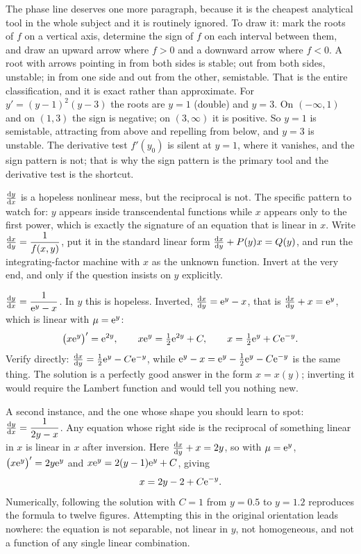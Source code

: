 The phase line deserves one more paragraph, because it is the cheapest analytical tool in the whole subject and it is routinely ignored. To draw it: mark the roots of $f$ on a vertical axis, determine the sign of $f$ on each interval between them, and draw an upward arrow where $f>0$ and a downward arrow where $f<0$. A root with arrows pointing in from both sides is stable; out from both sides, unstable; in from one side and out from the other, semistable. That is the entire classification, and it is exact rather than approximate. For $y'=(y-1)^{2}(y-3)$ the roots are $y=1$ (double) and $y=3$. On $(-\infty,1)$ and on $(1,3)$ the sign is negative; on $(3,\infty)$ it is positive. So $y=1$ is semistable, attracting from above and repelling from below, and $y=3$ is unstable. The derivative test $f'(y_0)$ is silent at $y=1$, where it vanishes, and the sign pattern is not; that is why the sign pattern is the primary tool and the derivative test is the shortcut.

\cue $\frac{\mathrm{d}y}{\mathrm{d}x}$ is a hopeless nonlinear mess, but the reciprocal is not. The specific pattern to watch for: $y$ appears inside transcendental functions while $x$ appears only to the first power, which is exactly the signature of an equation that is linear in $x$.
\method Write $\frac{\mathrm{d}x}{\mathrm{d}y}=\dfrac{1}{f(x,y)}$, put it in the standard linear form $\frac{\mathrm{d}x}{\mathrm{d}y}+P(y)x=Q(y)$, and run the integrating-factor machine with $x$ as the unknown function. Invert at the very end, and only if the question insists on $y$ explicitly.

\begin{worked}
$\frac{\mathrm{d}y}{\mathrm{d}x}=\dfrac{1}{\mathrm{e}^{y}-x}$. In $y$ this is hopeless. Inverted, $\frac{\mathrm{d}x}{\mathrm{d}y}=\mathrm{e}^{y}-x$, that is $\frac{\mathrm{d}x}{\mathrm{d}y}+x=\mathrm{e}^{y}$, which is linear with $\mu=\mathrm{e}^{y}$:
\[\bigl(x\mathrm{e}^{y}\bigr)'=\mathrm{e}^{2y},\qquad x\mathrm{e}^{y}=\tfrac12\mathrm{e}^{2y}+C,\qquad x=\tfrac12\mathrm{e}^{y}+C\mathrm{e}^{-y}.\]
Verify directly: $\frac{\mathrm{d}x}{\mathrm{d}y}=\tfrac12\mathrm{e}^{y}-C\mathrm{e}^{-y}$, while $\mathrm{e}^{y}-x=\mathrm{e}^{y}-\tfrac12\mathrm{e}^{y}-C\mathrm{e}^{-y}$ is the same thing. The solution is a perfectly good answer in the form $x=x(y)$; inverting it would require the Lambert function and would tell you nothing new.
\end{worked}

A second instance, and the one whose shape you should learn to spot: $\frac{\mathrm{d}y}{\mathrm{d}x}=\dfrac{1}{2y-x}$. Any equation whose right side is the reciprocal of something linear in $x$ is linear in $x$ after inversion. Here $\frac{\mathrm{d}x}{\mathrm{d}y}+x=2y$, so with $\mu=\mathrm{e}^{y}$, $\bigl(x\mathrm{e}^{y}\bigr)'=2y\mathrm{e}^{y}$ and $x\mathrm{e}^{y}=2(y-1)\mathrm{e}^{y}+C$, giving
\[x=2y-2+C\mathrm{e}^{-y}.\]
Numerically, following the solution with $C=1$ from $y=0.5$ to $y=1.2$ reproduces the formula to twelve figures. Attempting this in the original orientation leads nowhere: the equation is not separable, not linear in $y$, not homogeneous, and not a function of any single linear combination.

